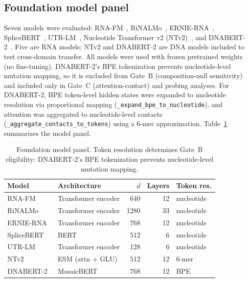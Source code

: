 \documentclass[11pt]{article}
\begin{document}
\subsection{Foundation model panel}

Seven models were evaluated: RNA-FM~\citep{rnafm2022},
RiNALMo~\citep{rinalmo2024}, ERNIE-RNA~\citep{ernierna2024},
SpliceBERT~\citep{splicebert2024}, UTR-LM~\citep{utrlm2024},
Nucleotide Transformer v2 (NTv2)~\citep{ntv22023}, and
DNABERT-2~\citep{dnabert22024}. Five are RNA models; NTv2 and DNABERT-2 are
DNA models included to test cross-domain transfer. All models were used with
frozen pretrained weights (no fine-tuning). DNABERT-2's BPE tokenization
prevents nucleotide-level mutation mapping, so it is excluded from Gate~B
(composition-null sensitivity) and included only in Gate~C
(attention-contact) and probing analyses. For DNABERT-2, BPE token-level
hidden states were expanded to nucleotide resolution via proportional mapping
(\texttt{\_expand\_bpe\_to\_nucleotide}), and attention was aggregated to
nucleotide-level contacts (\texttt{\_aggregate\_contacts\_to\_tokens}) using
a 6-mer approximation. Table~\ref{tab:models} summarizes the model panel.

\begin{table}[htbp]
\centering
\caption{Foundation model panel. Token resolution determines Gate~B
eligibility: DNABERT-2's BPE tokenization prevents nucleotide-level
mutation mapping.}
\label{tab:models}
\small
\begin{tabular}{llrrl}
\toprule
\textbf{Model} & \textbf{Architecture} & \textbf{$d$} & \textbf{Layers} & \textbf{Token res.} \\
\midrule
RNA-FM~\citep{rnafm2022}       & Transformer encoder  & 640 & 12 & nucleotide \\
RiNALMo~\citep{rinalmo2024}    & Transformer encoder  & 1280 & 33 & nucleotide \\
ERNIE-RNA~\citep{ernierna2024}  & Transformer encoder  & 768 & 12 & nucleotide \\
SpliceBERT~\citep{splicebert2024} & BERT              & 512 & 6 & nucleotide \\
UTR-LM~\citep{utrlm2024}       & Transformer encoder  & 128 & 6 & nucleotide \\
NTv2~\citep{ntv22023}           & ESM (attn + GLU)     & 512 & 12 & 6-mer \\
DNABERT-2~\citep{dnabert22024}  & MosaicBERT           & 768 & 12 & BPE \\
\bottomrule
\end{tabular}
\end{table}
\end{document}
